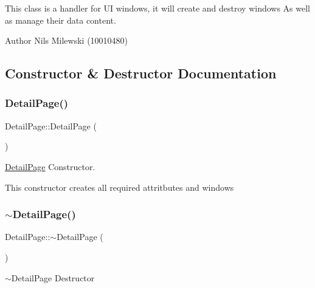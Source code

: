 This class is a handler for UI windows, it will create and destroy windows As well as manage their data content. \begin{DoxyAuthor}{Author}
Nils Milewski (10010480) 
\end{DoxyAuthor}


\subsection{Constructor \& Destructor Documentation}
\mbox{\label{classui_1_1window_1_1_detail_page_a151e61733c9f0cfbff77d58f161b15bf}} 
\subsubsection{\texorpdfstring{Detail\+Page()}{DetailPage()}}
{\footnotesize\ttfamily Detail\+Page\+::\+Detail\+Page (\begin{DoxyParamCaption}{ }\end{DoxyParamCaption})}



\mbox{\hyperlink{classui_1_1window_1_1_detail_page}{Detail\+Page}} Constructor. 

This constructor creates all required attritbutes and windows \mbox{\label{classui_1_1window_1_1_detail_page_ab50d547f466fa6b6bba924b79282aae1}} 
\subsubsection{\texorpdfstring{$\sim$\+Detail\+Page()}{~DetailPage()}}
{\footnotesize\ttfamily Detail\+Page\+::$\sim$\+Detail\+Page (\begin{DoxyParamCaption}{ }\end{DoxyParamCaption})\hspace{0.3cm}{\ttfamily [virtual]}}



$\sim$\+Detail\+Page Destructor 

